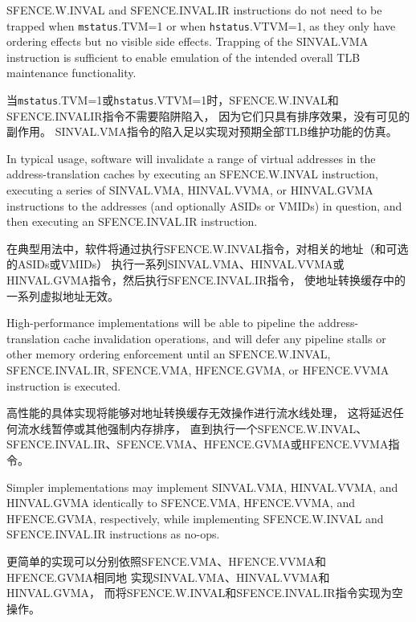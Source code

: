 \begin{commentary}
  SFENCE.W.INVAL and SFENCE.INVAL.IR instructions do not need to be trapped when
  {\tt mstatus}.TVM=1 or when {\tt hstatus}.VTVM=1, as they only have ordering
  effects but no visible side effects.  Trapping of the SINVAL.VMA instruction
  is sufficient to enable emulation of the intended overall TLB maintenance
  functionality.

  当{\tt mstatus}.TVM=1或{\tt hstatus}.VTVM=1时，SFENCE.W.INVAL和SFENCE.INVALIR指令不需要陷阱陷入，
  因为它们只具有排序效果，没有可见的副作用。
  SINVAL.VMA指令的陷入足以实现对预期全部TLB维护功能的仿真。

  In typical usage, software will invalidate a range of virtual addresses in
  the address-translation caches by executing an SFENCE.W.INVAL instruction,
  executing a series of SINVAL.VMA, HINVAL.VVMA, or HINVAL.GVMA instructions to
  the addresses (and optionally ASIDs or VMIDs) in question, and then executing
  an SFENCE.INVAL.IR instruction.

  在典型用法中，软件将通过执行SFENCE.W.INVAL指令，对相关的地址（和可选的ASIDs或VMIDs）
  执行一系列SINVAL.VMA、HINVAL.VVMA或HINVAL.GVMA指令，然后执行SFENCE.INVAL.IR指令，
  使地址转换缓存中的一系列虚拟地址无效。

  High-performance implementations will be able to pipeline the
  address-translation cache invalidation operations, and will defer any
  pipeline stalls or other memory ordering enforcement until an SFENCE.W.INVAL,
  SFENCE.INVAL.IR, SFENCE.VMA, HFENCE.GVMA, or HFENCE.VVMA instruction is
  executed.

  高性能的具体实现将能够对地址转换缓存无效操作进行流水线处理，
  这将延迟任何流水线暂停或其他强制内存排序，
  直到执行一个SFENCE.W.INVAL、SFENCE.INVAL.IR、SFENCE.VMA、HFENCE.GVMA或HFENCE.VVMA指令。

  Simpler implementations may implement SINVAL.VMA, HINVAL.VVMA, and
  HINVAL.GVMA identically to SFENCE.VMA, HFENCE.VVMA, and HFENCE.GVMA,
  respectively, while implementing SFENCE.W.INVAL and SFENCE.INVAL.IR
  instructions as no-ops.

  更简单的实现可以分别依照SFENCE.VMA、HFENCE.VVMA和HFENCE.GVMA相同地
  实现SINVAL.VMA、HINVAL.VVMA和HINVAL.GVMA，
  而将SFENCE.W.INVAL和SFENCE.INVAL.IR指令实现为空操作。
\end{commentary}
